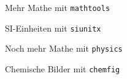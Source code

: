 \documentclass{beamer}
\begin{document}
		\begin{frame}[containsverbatim]{Mehr Mathe mit \texttt{mathtools}}
			\begin{latexcode}

			\end{latexcode}
		\end{frame}


		\begin{frame}[containsverbatim]{SI-Einheiten mit \texttt{siunitx}}
			\begin{latexcode}

			\end{latexcode}
		\end{frame}
				
		\begin{frame}[containsverbatim]{Noch mehr Mathe mit \texttt{physics}}
			\begin{latexcode}

			\end{latexcode}
		\end{frame}

		\begin{frame}[containsverbatim]{Chemische Bilder mit \texttt{chemfig}}
			\begin{latexcode}

			\end{latexcode}
		\end{frame}
\end{document}

